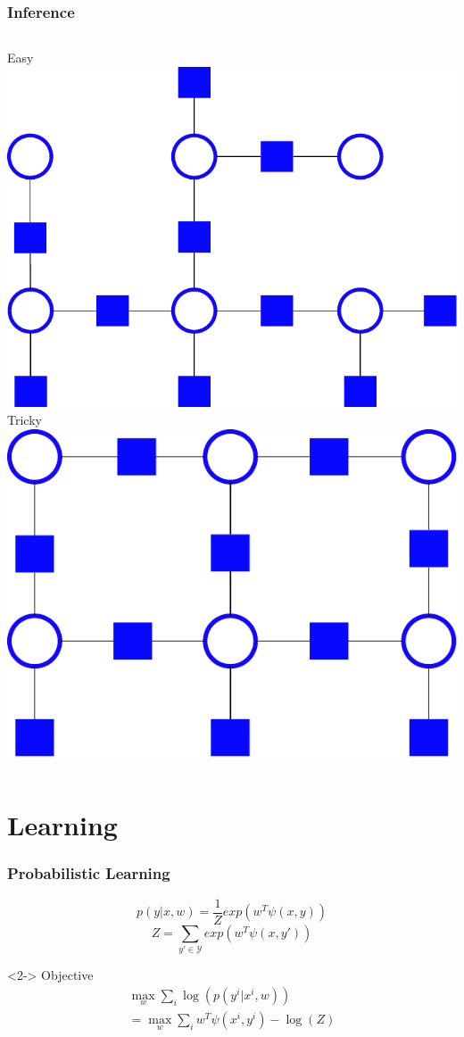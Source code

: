 \documentclass{beamer}
\newcommand{\hoch}[1]{^{#1}}
\begin{document}
    \begin{frame}
        \frametitle{Inference}
        \begin{columns}[t]
            Easy\\
            \vspace{5mm}
            \includegraphics[width=.8\textwidth]{images/tree_white_bg}
            Tricky\\
            \vspace{5mm}
            \includegraphics[width=.8\textwidth]{images/grid_white_bg}
        \end{columns}
    \end{frame}

    \section{Learning}
    \begin{frame}
        \frametitle{Probabilistic Learning}
        \[ p(y|x, w) = \frac{1}{Z} exp(w^T \psi(x, y))\]
        \[Z = \sum_{y' \in \mathcal{Y}} exp(w^T \psi(x, y')) \]
        \begin{visibleenv}<2->
        Objective
        \begin{align*}
            \max_w \sum_i \log(p(y\hoch{i} | x\hoch{i}, w))\\
            = \max_w \sum_i w^T \psi(x\hoch{i}, y\hoch{i}) - \log(Z)
        \end{align*}
        \end{visibleenv}

    \end{frame}
\end{document}
